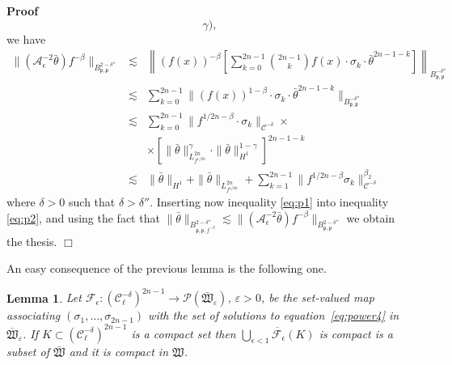 \documentclass[a4paper,10pt]{article}
\newenvironment{proof}{\noindent\textbf{Proof\ }}{\hspace*{\fill}$\Box$\medskip}
\newtheorem{lemma}[theorem]{Lemma}
\begin{document}
\begin{proof}
\begin{equation}
    \gamma), \label{eq:beta}
  \end{equation}
  we have
  \begin{equation}
    \begin{array}{lll}
      \| (\mathcal{A}_{\epsilon}^{- 2} \bar{\theta}) f^{- \beta} \|_{B^{2 -
      \delta''}_{\mathfrak{p}, \mathfrak{p}}} & \lesssim & \left\| (f (x))^{-
      \beta} \left[ \sum_{k = 0}^{2 n - 1} \binom{2 n - 1}{k} f (x) \cdot
      \sigma_k \cdot \bar{\theta}^{2 n - 1 - k} \right] \right\|_{B^{-
      \delta''}_{\mathfrak{p, \mathfrak{p}}}}\\
      & \lesssim & \sum_{k = 0}^{2 n - 1} \| (f (x))^{1 - \beta} \cdot
      \sigma_k \cdot \bar{\theta}^{2 n - 1 - k} \|_{B^{-
      \delta''}_{\mathfrak{p, \mathfrak{p}}}}\\
      & \lesssim & \sum_{k = 0}^{2 n - 1} \| f^{1 / 2 n - \beta} \cdot
      \sigma_k \|_{\mathcal{C}^{- \delta}} \times\\
      &  & \times \left[ \| \bar{\theta} \|_{L^{2 n}_{f^{1 / 2 n}}}^{\gamma}
      \cdot \| \bar{\theta} \|^{1 - \gamma}_{H^1} \right]^{2 n - 1 - k}\\
      & \lesssim & \| \bar{\theta} \|_{H^1} + \| \bar{\theta} \|_{L^{2
      n}_{f^{1 / 2 n}}} + \sum_{k = 1}^{2 n - 1} \| f^{1 / 2 n - \beta}
      \sigma_k \|_{\mathcal{C}^{- \delta}}^{\beta_2}
    \end{array} \label{eq:p2}
  \end{equation}
  where $\delta > 0$ such that $\delta > \delta''$. Inserting now inequality
  {\eqref{eq:p1}} into inequality {\eqref{eq:p2}}, and using the fact that $\|
  \bar{\theta} \|_{B^{2 - \delta''}_{\mathfrak{p}, \mathfrak{p}, f^{- \beta}}}
  \lesssim \| (\mathcal{A}_{\epsilon}^{- 2} \bar{\theta}) f^{- \beta} \|_{B^{2
  - \delta''}_{\mathfrak{p}, \mathfrak{p}}}$ we obtain the thesis.
\end{proof}

An easy consequence of the previous lemma is the following one.

\begin{lemma}
  \label{lemma_powercompact}Let $\mathcal{F}_{\epsilon} : (\mathcal{C}^{-
  \delta}_{\ell})^{2 n - 1} \rightarrow \mathcal{P}
  (\mathfrak{\bar{W}_{\varepsilon}})$, $\varepsilon > 0$, be the set-valued
  map associating $(\sigma_1, \ldots, \sigma_{2 n - 1})$ with the set of
  solutions to equation~{\eqref{eq:power4}} in
  $\overline{\mathfrak{W}}_{\varepsilon}$. If $K \subset (\mathcal{C}^{-
  \delta}_{\ell})^{2 n - 1}$ is a compact set then
  $\overline{\bigcup_{\epsilon < 1} \mathcal{F}_{\epsilon} (K)}$ is compact is
  a subset of $\mathfrak{\bar{W}}$ and it is compact in $\mathfrak{W}$.
\end{lemma}
\end{document}
